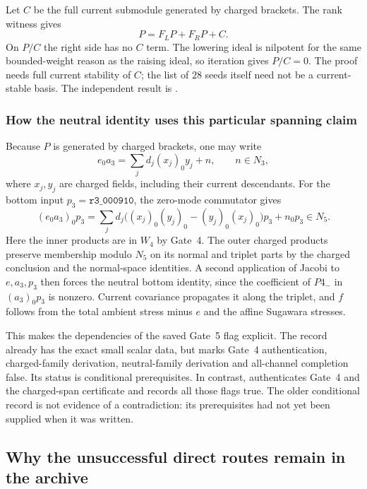 Let $C$ be the full current submodule generated by charged brackets.
The rank witness gives
\[
 P=F_LP+F_RP+C.
\]
On $P/C$ the right side has no $C$ term. The lowering ideal is
nilpotent for the same bounded-weight reason as the raising ideal, so
iteration gives $P/C=0$. The proof needs full current stability of
$C$; the list of $28$ seeds itself need not be a current-stable basis.
The independent result is
.

\subsubsection{How the neutral identity uses this particular spanning claim}

Because $P$ is generated by charged brackets, one may write
\[
 e_0a_3=\sum_jd_j(x_j)_0y_j+n,
 \qquad n\in N_3,
\]
where $x_j,y_j$ are charged fields, including their current
descendants. For the bottom input $p_3=\texttt{r3\_000910}$,
the zero-mode commutator gives
\[
 (e_0a_3)_0p_3
  =\sum_jd_j\bigl((x_j)_0(y_j)_0-(y_j)_0(x_j)_0\bigr)p_3
       +n_0p_3\in N_5.
\]
Here the inner products are in $W_4$ by Gate~4. The outer charged
products preserve membership modulo $N_5$ on its normal and triplet
parts by the charged conclusion and the normal-space identities.
A second application of Jacobi to $e,a_3,p_3$ then forces the neutral
bottom identity, since the coefficient of $P4_-$ in $(a_3)_0p_3$
is nonzero. Current covariance propagates it along the triplet, and
$f$ follows from the total ambient stress minus $e$ and the affine
Sugawara stresses.

This makes the dependencies of the saved Gate~5 flag explicit. The
record 
already has the exact small scalar data, but marks Gate~4 authentication,
charged-family derivation, neutral-family derivation and all-channel
completion false. Its status is conditional prerequisites. In contrast,
authenticates Gate~4 and the charged-span certificate and records all
those flags true. The older conditional record is not evidence of a
contradiction: its prerequisites had not yet been supplied when it was
written.

\subsection{Why the unsuccessful direct routes remain in the archive}
\label{expfinite:historical-routes}

